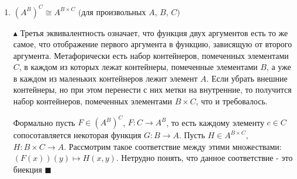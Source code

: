\begin{enumerate}
    \item $(A^B)^C \cong A^{B \times C} \mbox{ (для произвольных $A$, $B$, $C$)}$
    \par $\blacktriangle$ Третья эквивалентность означает, что функция двух аргументов есть то же самое, что отображение первого аргумента в функцию, зависящую от второго аргумента. Метафорически есть набор контейнеров, помеченных элементами $C$, в каждом из которых лежат контейнеры, помеченные элементами $B$, а уже в каждом из маленьких контейнеров лежит элемент $A$. Если убрать внешние контейнеры, но при этом перенести с них метки на внутренние, то получится набор контейнеров, помеченных элементами $B \times C$, что и требовалось. 
    \par Формально пусть $F \in (A^B)^C$, $F: C \rightarrow A^B$, то есть каждому элементу $c \in C$ сопосотавляется некоторая функция $G: B \rightarrow A$. Пусть $H \in A^{B \times C}$, $H: B \times C \rightarrow A$. Рассмотрим такое соответствие между этими множествами: $(F(x))(y) \longmapsto H(x, y)$. Нетрудно понять, что данное соответствие - это биекция $\blacksquare$
\end{enumerate}